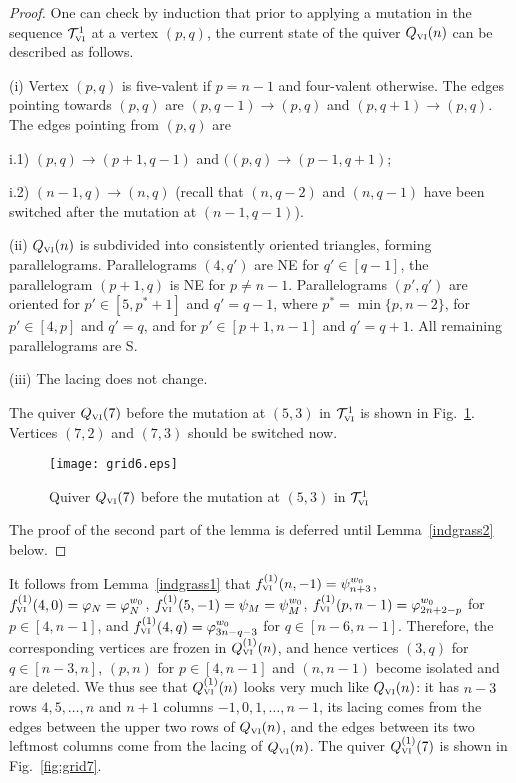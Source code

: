 \documentclass{amsart}
\theoremstyle{definition}
\theoremstyle{remark}
\numberwithin{equation}{section}
\numberwithin{theorem}{section}
\begin{document}
\begin{proof}
One can check by induction that prior to applying a mutation in the sequence ${{\mathcal T}}^1_{\mbox{\tiny\rm VI}}$ at
a vertex $(p,q)$, the current state of the quiver $Q_{\mbox{\tiny\rm VI}}(n)$ can be described as follows.

(i) Vertex $(p,q)$ is five-valent if $p=n-1$ and four-valent otherwise. The edges pointing towards
$(p,q)$ are $(p,q-1)\to (p,q)$ and $(p,q+1)\to(p,q)$. The edges pointing from $(p,q)$ are

i.1) $(p,q)\to (p+1,q-1)$ and $((p,q)\to (p-1,q+1)$;

i.2) $(n-1,q)\to (n,q)$ (recall that $(n,q-2)$ and $(n,q-1)$ have been switched after the mutation
at $(n-1,q-1)$).

(ii) $Q_{\mbox{\tiny\rm VI}}(n)$ is subdivided into consistently oriented triangles,
forming parallelograms. Parallelograms $(4,q')$ are NE for $q'\in[q-1]$, the parallelogram $(p+1,q)$
is NE for $p\ne n-1$. Parallelograms $(p',q')$ are oriented for $p'\in [5,p^*+1]$ and $q'=q-1$,
where $p^*=\min\{p,n-2\}$, for $p'\in [4,p]$ and $q'=q$, and for $p'\in[p+1,n-1]$ and $q'=q+1$.
All remaining parallelograms are S.

(iii) The lacing does not change.

The quiver $Q_{\mbox{\tiny\rm VI}}(7)$ before the mutation at $(5,3)$ in ${{\mathcal T}}^1_{\mbox{\tiny\rm VI}}$ is shown in Fig.~\ref{fig:grid6}. Vertices $(7,2)$ and $(7,3)$ should be switched now.

 \begin{figure}[ht]
\begin{center}
\texttt{[image: grid6.eps]}
\caption{Quiver $Q_{\mbox{\tiny\rm VI}}(7)$ before the mutation at $(5,3)$ in ${{\mathcal T}}^1_{\mbox{\tiny\rm VI}}$}
\label{fig:grid6}
\end{center}
\end{figure} 

The proof of the second part of the lemma is deferred until Lemma~\ref{indgrass2} below.
\end{proof}

It follows from Lemma~\ref{indgrass1} that 
$f_{\mbox{\tiny\rm VI}}^{(1)}(n,-1) = {{\psi}}^{w_0}_{n+3}$, 
$f_{\mbox{\tiny\rm VI}}^{(1)}(4,0) = {{\varphi}}_N={{\varphi}}_N^{w_0}$, 
$f_{\mbox{\tiny\rm VI}}^{(1)}(5,-1) = {{\psi}}_M={{\psi}}_M^{w_0}$, 
$f_{\mbox{\tiny\rm VI}}^{(1)}(p,n-1) = {{\varphi}}^{w_0}_{2n+2 - p}$ for $p\in [4, n-1]$, and 
$f_{\mbox{\tiny\rm VI}}^{(1)}(4, q) = {{\varphi}}^{w_0}_{3n - q-3}$ for $q\in [n-6, n-1]$. Therefore,
the corresponding vertices are frozen in $Q^{(1)}_{\mbox{\tiny\rm VI}}(n)$, and hence vertices
$(3,q)$ for $q\in [n-3,n]$, $(p,n)$ for $p\in [4,n-1]$ and $(n,n-1)$ become isolated and
are deleted. We thus see that $Q^{(1)}_{\mbox{\tiny\rm VI}}(n)$ looks very much like $Q_{\mbox{\tiny\rm VI}}(n)$: it has
$n-3$ rows $4, 5,\dots,n$ and $n+1$ columns $-1,0, 1, \dots, n-1$, its lacing comes from the edges
between the upper two rows of $Q_{\mbox{\tiny\rm VI}}(n)$, and the edges between its two leftmost columns
come from the lacing of $Q_{\mbox{\tiny\rm VI}}(n)$. The quiver $Q^{(1)}_{\mbox{\tiny\rm VI}}(7)$ is shown in Fig.~\ref{fig:grid7}. 
\end{document}
